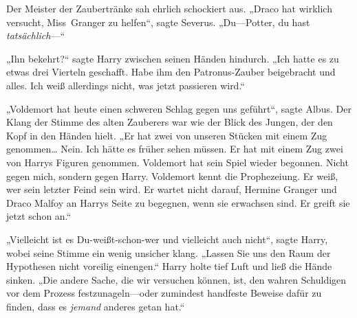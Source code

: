 Der Meister der Zaubertränke sah ehrlich schockiert aus. „Draco hat wirklich versucht, Miss~Granger zu helfen“, sagte Severus. „Du—Potter, du hast \emph{tatsächlich}—“

„Ihn bekehrt?“ sagte Harry zwischen seinen Händen hindurch. „Ich hatte es zu etwas drei Vierteln geschafft. Habe ihm den Patronus-Zauber beigebracht und alles. Ich weiß allerdings nicht, was jetzt passieren wird.“

„Voldemort hat heute einen schweren Schlag gegen uns geführt“, sagte Albus. Der Klang der Stimme des alten Zauberers war wie der Blick des Jungen, der den Kopf in den Händen hielt. „Er hat zwei von unseren Stücken mit einem Zug genommen… Nein. Ich hätte es früher sehen müssen. Er hat mit einem Zug zwei von Harrys Figuren genommen. Voldemort hat sein Spiel wieder begonnen. Nicht gegen mich, sondern gegen Harry. Voldemort kennt die Prophezeiung. Er weiß, wer sein letzter Feind sein wird. Er wartet nicht darauf, Hermine Granger und Draco Malfoy an Harrys Seite zu begegnen, wenn sie erwachsen sind. Er greift sie jetzt schon an.“

„Vielleicht ist es Du-weißt-schon-wer und vielleicht auch nicht“, sagte Harry, wobei seine Stimme ein wenig unsicher klang. „Lassen Sie uns den Raum der Hypothesen nicht voreilig einengen.“ Harry holte tief Luft und ließ die Hände sinken. „Die andere Sache, die wir versuchen können, ist, den wahren Schuldigen vor dem Prozess festzunageln—oder zumindest handfeste Beweise dafür zu finden, dass es \emph{jemand} anderes getan hat.“

